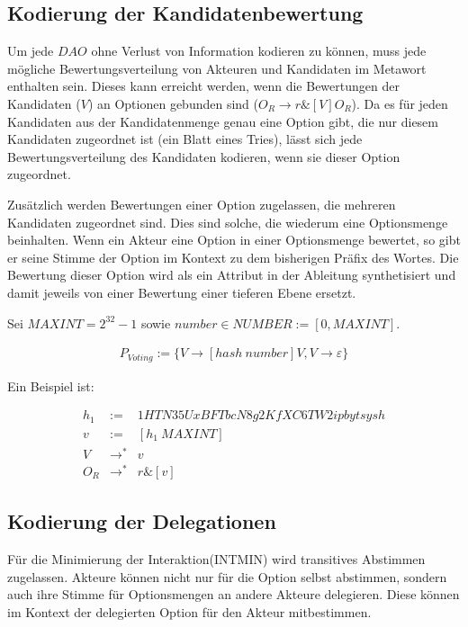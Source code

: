 \documentclass[a4paper,12pt]{report}
\begin{document}
\subsection{Kodierung der Kandidatenbewertung}
Um jede $DAO$ ohne Verlust von Information kodieren zu können, muss jede mögliche Bewertungsverteilung von Akteuren und Kandidaten im Metawort enthalten sein. 
Dieses kann erreicht werden, wenn die Bewertungen der Kandidaten ($V$) an Optionen gebunden sind ($O_R \rightarrow r\& [V] O_R$). Da es für jeden Kandidaten aus der Kandidatenmenge genau eine Option gibt, die nur diesem Kandidaten zugeordnet ist (ein Blatt eines Tries), lässt sich jede Bewertungsverteilung des Kandidaten kodieren, wenn sie dieser Option zugeordnet. 

Zusätzlich werden Bewertungen einer Option zugelassen, die mehreren Kandidaten zugeordnet sind. Dies sind solche, die wiederum eine Optionsmenge beinhalten. Wenn ein Akteur eine Option in einer Optionsmenge bewertet, so gibt er seine Stimme der Option im Kontext zu dem bisherigen Präfix des Wortes.
Die Bewertung dieser Option wird als ein Attribut in der Ableitung synthetisiert\cite{Knuth1968} und damit jeweils von einer Bewertung einer tieferen Ebene ersetzt.

Sei $MAXINT = 2^{32}-1$ sowie $number\in NUMBER:=[0,MAXINT]$.



\begin{eqnarray}
P_{Voting} := \{V\rightarrow [hash\ number]V, V \rightarrow \varepsilon\}
\end{eqnarray}
  
 Ein Beispiel ist:

\begin{eqnarray}
  h_1 &:=& 1HTN35UxBFTbcN8g2KfXC6TW2ipbytsysh\\
  v &:=& [h_1\ MAXINT] \\
  V &\rightarrow^*& v \\
  O_R &\rightarrow^*& r\&[v]
\end{eqnarray}



\subsection{Kodierung der Delegationen}

Für die Minimierung der Interaktion(INTMIN) wird transitives Abstimmen zugelassen. Akteure können nicht nur für die Option selbst abstimmen, sondern auch ihre Stimme für Optionsmengen an andere Akteure delegieren. Diese können im Kontext der delegierten Option für den Akteur mitbestimmen.
\end{document}

